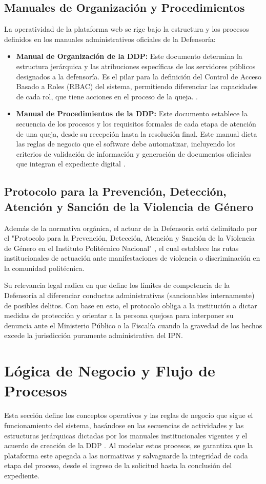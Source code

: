 \subsection{Manuales de Organización y Procedimientos}
La operatividad de la plataforma web se rige bajo la estructura y los procesos definidos en los manuales administrativos oficiales de la Defensoría:
\begin{itemize}
    \item \textbf{Manual de Organización de la DDP:} Este documento determina la estructura jerárquica y las atribuciones específicas de los servidores públicos designados a la defensoría. Es el pilar para la definición del Control de Acceso Basado a Roles (RBAC) del sistema, permitiendo diferenciar las capacidades de cada rol, que tiene acciones en el proceso de la queja. \cite{4} .
    \item \textbf{Manual de Procedimientos de la DDP:} Este documento establece la secuencia de los procesos y los requisitos formales de cada etapa de atención de una queja, desde su recepción hasta la resolución final. Este manual dicta las reglas de negocio que el software debe automatizar, incluyendo los criterios de validación de información y generación de documentos oficiales que integran el expediente digital \cite{5} .
\end{itemize}

\subsection{Protocolo para la Prevención, Detección, Atención y Sanción de la Violencia de Género}
Además de la normativa orgánica, el actuar de la Defensoría está delimitado por el "Protocolo para la Prevención, Detección, Atención y Sanción de la Violencia de Género en el Instituto Politécnico Nacional" \cite{26} , el cual establece las rutas institucionales de actuación ante manifestaciones de violencia o discriminación en la comunidad politécnica.

Su relevancia legal radica en que define los límites de competencia de la Defensoría al diferenciar conductas administrativas (sancionables internamente) de posibles delitos. Con base en esto, el protocolo obliga a la institución a dictar medidas de protección y orientar a la persona quejosa para interponer su denuncia ante el Ministerio Público o la Fiscalía cuando la gravedad de los hechos excede la jurisdicción puramente administrativa del IPN.

\section{Lógica de Negocio y Flujo de Procesos}
Esta sección define los conceptos operativos y las reglas de negocio que sigue el funcionamiento del sistema, basándose en las secuencias de actividades y las estructuras jerárquicas dictadas por los manuales institucionales vigentes \cite{4} \cite{5}  y el acuerdo de creación de la DDP \cite{3} . Al modelar estos procesos, se garantiza que la plataforma este apegada a las normativas y salvaguarde la integridad de cada etapa del proceso, desde el ingreso de la solicitud hasta la conclusión del expediente.


